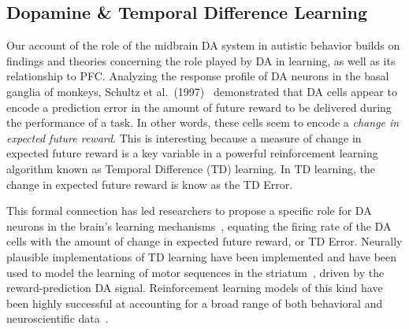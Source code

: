 \subsection{Dopamine \& Temporal Difference Learning}
Our account of the role of the midbrain DA system in autistic behavior builds on findings and theories concerning the role played by DA in learning, as well as its relationship to PFC. Analyzing the response profile of DA neurons in the basal ganglia of monkeys, Schultz et al.~(1997)~\nocite{schultz97td} demonstrated that DA cells appear to encode a prediction error in the amount of future reward to be delivered during the performance of a task. In other words, these cells seem to encode a \emph{change in expected future reward}. This is interesting because a measure of change in expected future reward is a key variable in a powerful reinforcement learning algorithm known as Temporal Difference (TD) learning. In TD learning, the change in expected future reward is know as the TD Error. %


This formal connection has led researchers to propose a specific role for DA neurons in the brain's learning mechanisms~\cite{MontaguePR:1996:Dopamine}, equating the firing rate of the DA cells with the amount of change in expected future reward, or TD Error. Neurally plausible implementations of TD learning have been implemented and have been used to model the learning of motor sequences in the striatum~\cite{BartoAG:1994:TDLearning}, driven by the reward-prediction DA signal. Reinforcement learning models of this kind have been highly successful at accounting for a broad range of both behavioral and neuroscientific data~\cite{DayanP:2008:Ugly}.


